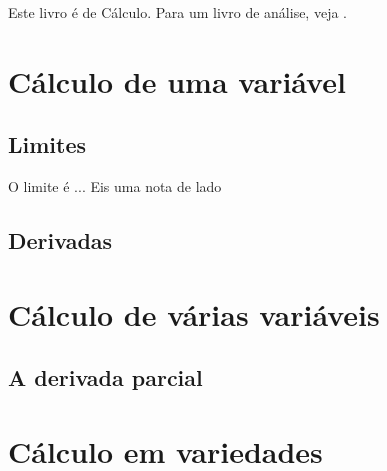 \documentclass[symmetric,a4paper,justified]{tufte-book}
\begin{document}
Este livro é de Cálculo. Para um livro de análise, veja \cite{Rudin}.
\mainmatter

\part{Cálculo de uma variável}

\chapter{Limites}
O limite é ... Eis uma nota de lado
\chapter{Derivadas}

\part{Cálculo de várias variáveis}
\chapter{A derivada parcial}

\part{Cálculo em variedades}













\backmatter





\printindex
\end{document}
